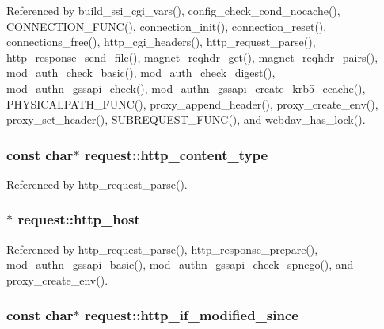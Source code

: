 Referenced by build\-\_\-ssi\-\_\-cgi\-\_\-vars(), config\-\_\-check\-\_\-cond\-\_\-nocache(), C\-O\-N\-N\-E\-C\-T\-I\-O\-N\-\_\-\-F\-U\-N\-C(), connection\-\_\-init(), connection\-\_\-reset(), connections\-\_\-free(), http\-\_\-cgi\-\_\-headers(), http\-\_\-request\-\_\-parse(), http\-\_\-response\-\_\-send\-\_\-file(), magnet\-\_\-reqhdr\-\_\-get(), magnet\-\_\-reqhdr\-\_\-pairs(), mod\-\_\-auth\-\_\-check\-\_\-basic(), mod\-\_\-auth\-\_\-check\-\_\-digest(), mod\-\_\-authn\-\_\-gssapi\-\_\-check(), mod\-\_\-authn\-\_\-gssapi\-\_\-create\-\_\-krb5\-\_\-ccache(), P\-H\-Y\-S\-I\-C\-A\-L\-P\-A\-T\-H\-\_\-\-F\-U\-N\-C(), proxy\-\_\-append\-\_\-header(), proxy\-\_\-create\-\_\-env(), proxy\-\_\-set\-\_\-header(), S\-U\-B\-R\-E\-Q\-U\-E\-S\-T\-\_\-\-F\-U\-N\-C(), and webdav\-\_\-has\-\_\-lock().

\hypertarget{structrequest_ac40920f89b3f58bc9cfa73ea8a2be93d}{
\subsubsection[{http\-\_\-content\-\_\-type}]{\setlength{\rightskip}{0pt plus 5cm}const char$\ast$ request\-::http\-\_\-content\-\_\-type}}\label{structrequest_ac40920f89b3f58bc9cfa73ea8a2be93d}


Referenced by http\-\_\-request\-\_\-parse().

\hypertarget{structrequest_a93886da76208cd2216ef882d52503280}{
\subsubsection[{http\-\_\-host}]{$\ast$ request\-::http\-\_\-host}}\label{structrequest_a93886da76208cd2216ef882d52503280}


Referenced by http\-\_\-request\-\_\-parse(), http\-\_\-response\-\_\-prepare(), mod\-\_\-authn\-\_\-gssapi\-\_\-basic(), mod\-\_\-authn\-\_\-gssapi\-\_\-check\-\_\-spnego(), and proxy\-\_\-create\-\_\-env().

\hypertarget{structrequest_a4f361bdb4023a9f42e9ef455d63d89cb}{
\subsubsection[{http\-\_\-if\-\_\-modified\-\_\-since}]{\setlength{\rightskip}{0pt plus 5cm}const char$\ast$ request\-::http\-\_\-if\-\_\-modified\-\_\-since}}\label{structrequest_a4f361bdb4023a9f42e9ef455d63d89cb}


